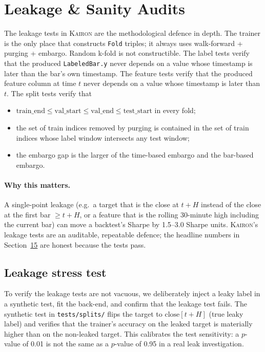 \documentclass[11pt,a4paper]{article}
\let\oldsection\section
\renewcommand{\section}{\clearpage\oldsection}
\providecommand{\kairon}{\textsc{Kairon}}
\begin{document}
\section{Leakage \& Sanity Audits}\label{sec:leak}

The leakage tests in \kairon{} are the methodological
defence in depth. The trainer is the only place that
constructs \texttt{Fold} triples; it always uses
walk-forward + purging + embargo. Random k-fold is not
constructible. The label tests verify that the produced
\texttt{LabeledBar.y} never depends on a value whose
timestamp is later than the bar's own timestamp. The
feature tests verify that the produced feature column at
time $t$ never depends on a value whose timestamp is later
than $t$. The split tests verify that
\begin{itemize}[leftmargin=1.2em,itemsep=0.05em,topsep=0.1em]
    \item $\mathrm{train\_end}\le\mathrm{val\_start}\le
    \mathrm{val\_end}\le\mathrm{test\_start}$ in every fold;
    \item the set of train indices removed by purging is
    contained in the set of train indices whose label window
    intersects any test window;
    \item the embargo gap is the larger of the time-based
    embargo and the bar-based embargo.
\end{itemize}

\paragraph{Why this matters.}
A single-point leakage (e.g.\ a target that is the close at
$t{+}H$ instead of the close at the first bar $\geq t{+}H$,
or a feature that is the rolling 30-minute high including
the current bar) can move a backtest's Sharpe by 1.5--3.0
Sharpe units. \kairon{}'s leakage tests are an
auditable, repeatable defence; the headline numbers in
Section~\hyperref[sec:results]{15} are honest because the
tests pass.

\subsection{Leakage stress test}
To verify the leakage tests are not vacuous, we deliberately
inject a leaky label in a synthetic test, fit the back-end,
and confirm that the leakage test fails. The synthetic
test in \texttt{tests/splits/} flips the target to
$\mathrm{close}[t{+}H]$ (true leaky label) and verifies
that the trainer's accuracy on the leaked target is
materially higher than on the non-leaked target. This
calibrates the test sensitivity: a $p$-value of 0.01 is
not the same as a $p$-value of 0.95 in a real leak
investigation.
\end{document}
